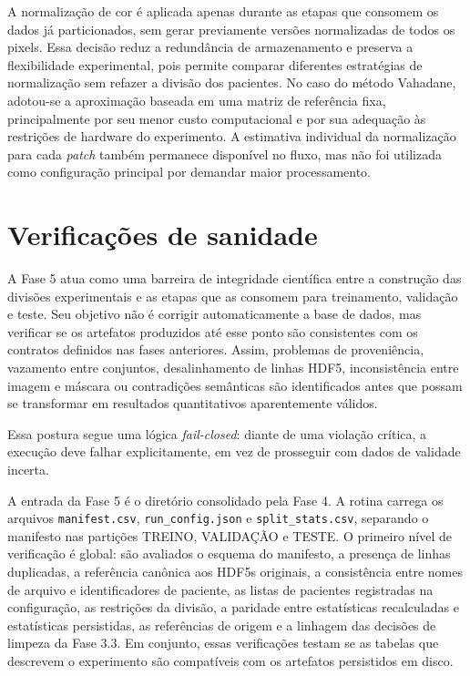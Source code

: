 A normalização de cor é aplicada apenas durante as etapas que consomem os dados já particionados, sem gerar previamente versões normalizadas de todos os pixels. Essa decisão reduz a redundância de armazenamento e preserva a flexibilidade experimental, pois permite comparar diferentes estratégias de normalização sem refazer a divisão dos pacientes. No caso do método Vahadane, adotou-se a aproximação baseada em uma matriz de referência fixa, principalmente por seu menor custo computacional e por sua adequação às restrições de hardware do experimento. A estimativa individual da normalização para cada \textit{patch} também permanece disponível no fluxo, mas não foi utilizada como configuração principal por demandar maior processamento.

\section{Verificações de sanidade}\label{sec:met_sanidade}

A Fase 5 atua como uma barreira de integridade científica entre a construção das
divisões experimentais e as etapas que as consomem para treinamento, validação e
teste. Seu objetivo não é corrigir automaticamente a base de dados, mas verificar
se os artefatos produzidos até esse ponto são consistentes com os contratos
definidos nas fases anteriores. Assim, problemas de proveniência, vazamento entre
conjuntos, desalinhamento de linhas HDF5, inconsistência entre imagem e máscara
ou contradições semânticas são identificados antes que possam se transformar em
resultados quantitativos aparentemente válidos.

Essa postura segue uma lógica \textit{fail-closed}: diante de uma violação
crítica, a execução deve falhar explicitamente, em vez de prosseguir com dados de
validade incerta.

A entrada da Fase 5 é o diretório consolidado pela Fase 4. A rotina carrega os arquivos
\texttt{manifest.csv}, \texttt{run\_config.json} e
\texttt{split\_stats.csv}, separando o manifesto nas partições
TREINO, VALIDAÇÃO e TESTE. O primeiro nível de
verificação é global: são avaliados o esquema do manifesto, a presença de linhas
duplicadas, a referência canônica aos HDF5s originais, a consistência entre nomes
de arquivo e identificadores de paciente, as listas de pacientes registradas na
configuração, as restrições da divisão, a paridade entre estatísticas
recalculadas e estatísticas persistidas, as referências de origem e a linhagem
das decisões de limpeza da Fase 3.3. Em conjunto, essas verificações testam se as
tabelas que descrevem o experimento são compatíveis com os artefatos persistidos
em disco.

